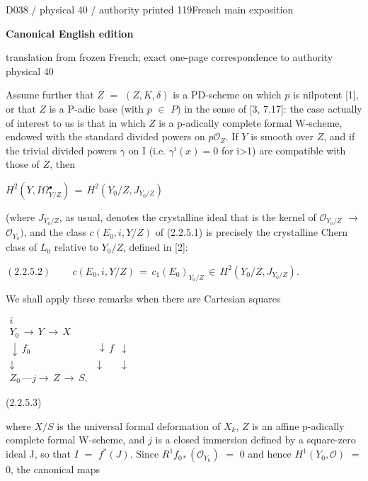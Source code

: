 \documentclass[9pt]{article}
\newcommand{\CanonText}[1]{\par{\fontsize{8.0}{9.35}\selectfont\RaggedRight #1\par}\vspace{2.2pt}}
\newcommand{\CanonDisplay}[1]{\par\vspace{1.2pt}\begin{center}{\fontsize{7.2}{8.4}\selectfont\(\displaystyle #1\)}\end{center}\vspace{1.2pt}}
\newenvironment{CanonMathBlock}{\par\vspace{1.2pt}\begin{center}\fontsize{6.8}{8.0}\selectfont\(\displaystyle}{\)\end{center}\vspace{1.2pt}}
\newcommand{\LayerTitle}{Canonical English edition}
\begin{document}
\noindent\begin{minipage}[t][\dimexpr\textheight-5pt\relax][t]{\textwidth}
{\sffamily\fontsize{7.3}{8.2}\selectfont\color{Quiet} D038 / physical 40 / authority printed 119\hfill French main exposition}
\par{}\vspace{4.5pt}
{\sffamily\fontsize{10.4}{11.6}\selectfont\bfseries\color{Accent} \LayerTitle}
\par{\sffamily\fontsize{6.7}{7.7}\selectfont\color{Quiet} translation from frozen French; exact one-page correspondence to authority physical 40}
\vspace{5pt}
\CanonText{Assume further that \(Z\) \(=\) \((Z,K,\delta{})\) is a PD-scheme on which \(p\) is nilpotent [1], or that \(Z\) is a P-adic base (with \(p\) \(\in{}\) \(P)\) in the sense of [3, 7.17]: the case actually of interest to us is that in which \(Z\) is a p-adically complete formal W-scheme, endowed with the standard divided powers on \(p\mathcal{O}_{Z}\). If \(Y\) is smooth over \(Z\), and if the trivial divided powers \(\gamma{}\) on I (i.e. \(\gamma{}^{i}(x)=0\) for i>1) are compatible with those of \(Z\), then}
\CanonDisplay{H^{2}(Y,I\Omega{}^{\bullet{}}_{Y/Z})\,=\,H^{2}(Y_{0}/Z,J_{Y_{0}/Z})}
\CanonText{(where \(J_{Y_{0}/Z}\), as usual, denotes the crystalline ideal that is the kernel of \(\mathcal{O}_{Y_{0}/Z}\) \(\to{}\) \(\mathcal{O}_{Y_{0}})\), and the class \(c(E_{0},i,Y/Z)\) of (2.2.5.1) is precisely the crystalline Chern class of \(L_{0}\) relative to \(Y_{0}/Z\), defined in [2]:}
\CanonDisplay{(2.2.5.2)\qquad\,c(E_{0},i,Y/Z)\,=\,c_{1}(E_{0})_{Y_{0}/Z}\,\in{}\,H^{2}(Y_{0}/Z,J_{Y_{0}/Z}).}
\CanonText{We shall apply these remarks when there are Cartesian squares}
\begin{CanonMathBlock}
\begin{array}{ccc}
i & {} & {}\\
Y_{0}\,\longrightarrow{}\,Y\,\longrightarrow{}\,X & {} & {}\\
\downarrow{}\,f_{0} & \downarrow{}\,f & \downarrow{}\\
\downarrow{} & \downarrow{} & \downarrow{}\\
Z_{0}\,\text{---}j\longrightarrow{}\,Z\,\longrightarrow{}\,S, & {} & {}
\end{array}
\end{CanonMathBlock}
\CanonText{(2.2.5.3)}
\CanonText{where \(X/S\) is the universal formal deformation of \(X_{k}\), \(Z\) is an affine p-adically complete formal W-scheme, and \(j\) is a closed immersion defined by a square-zero ideal J, so that \(I\) \(=\) \(f^{*}(J)\). Since \(R^{1}f_{0*}(\mathcal{O}_{Y_{0}})\) \(=\) 0 and hence \(H^{1}(Y_{0},\mathcal{O})\) \(=\) 0, the canonical maps}

\end{minipage}
\end{document}

